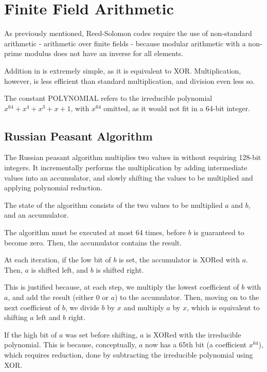 \chapter{Finite Field Arithmetic}

As previously mentioned, Reed-Solomon codes require the use of non-standard arithmetic - arithmetic over finite fields - because modular arithmetic with a non-prime modulus does not have an inverse for all elements.

Addition in  is extremely simple, as it is equivalent to XOR.
Multiplication, however, is less efficient than standard multiplication, and division even less so.

The constant $\text{POLYNOMIAL}$ refers to the irreducible polynomial $x^{64} + x^4 + x^3 + x + 1$, with $x^{64}$ omitted, as it would not fit in a 64-bit integer.

\section{Russian Peasant Algorithm}

The Russian peasant algorithm multiplies two values in  without requiring 128-bit integers.
It incrementally performs the multiplication by adding intermediate values into an accumulator, and slowly shifting the values to be multiplied and applying polynomial reduction.

The state of the algorithm consists of the two values to be multiplied $a$ and $b$, and an accumulator.

The algorithm must be executed at most 64 times, before $b$ is guaranteed to become zero. Then, the accumulator contains the result.

At each iteration, if the low bit of $b$ is set, the accumulator is XORed with $a$.
Then, $a$ is shifted left, and $b$ is shifted right.

This is justified because, at each step, we multiply the lowest coefficient of $b$ with $a$, and add the result (either $0$ or $a$) to the accumulator.
Then, moving on to the next coefficient of $b$, we divide $b$ by $x$ and multiply $a$ by $x$, which is equivalent to shifting $a$ left and $b$ right.

If the high bit of $a$ was set before shifting, $a$ is XORed with the irreducible polynomial.
This is because, conceptually, $a$ now has a 65th bit (a coefficient $x^{64}$), which requires reduction, done by subtracting the irreducible polynomial using XOR.

